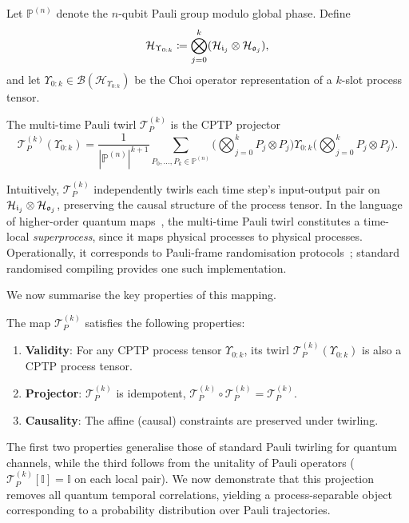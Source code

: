 Let \(\mathbb{P}^{(n)}\) denote the \(n\)-qubit Pauli group modulo global phase. Define 
\begin{equation}
    \mathcal{H}_{\Upsilon_{0:k}} \coloneq \bigotimes_{j=0}^k(\mathcal{H}_{\mathfrak{i}_j} \otimes \mathcal{H}_{\mathfrak{o}_j}),
\end{equation}
and let \(\Upsilon_{0:k} \in \mathcal{B}(\mathcal{H}_{\Upsilon_{0:k}})\) be the Choi operator representation of a \(k\)-slot process tensor.
\begin{definition}\label{def:multi-time-twirl}
    The multi-time Pauli twirl \(\mathcal{T}_P^{(k)}\) is the CPTP projector
    \begin{equation}\label{eq:twirl-upsilon}
        \mathcal{T}_P^{(k)}(\Upsilon_{0:k}) = 
        \frac{1}{|\mathbb{P}^{(n)}|^{k+1}}
        \sum_{P_0,\dots,P_k\in\mathbb{P}^{(n)}}
        \Bigg(\bigotimes_{j=0}^k P_j\otimes P_j\Bigg)
        \Upsilon_{0:k}
        \Bigg(\bigotimes_{j=0}^k P_j\otimes P_j\Bigg).
    \end{equation}
\end{definition}
Intuitively, \(\mathcal{T}_P^{(k)}\) independently twirls each time step's input-output pair on \(\mathcal{H}_{\mathfrak{i}_j} \otimes \mathcal{H}_{\mathfrak{o}_j}\), preserving the causal structure of the process tensor. In the language of higher-order quantum maps~\cite{tarantoHigherOrderQuantumOperations2025}, the multi-time Pauli twirl constitutes a time-local \emph{superprocess}, since it maps physical processes to physical processes. Operationally, it corresponds to Pauli-frame randomisation protocols~\cite{figueroa-romeroOperationalMarkovianizationRandomized2024}; standard randomised compiling provides one such implementation.

We now summarise the key properties of this mapping.
\begin{proposition}[Properties]
    The map \(\mathcal{T}_P^{(k)}\) satisfies the following properties:
    \begin{enumerate}
        \item \textbf{Validity}: For any CPTP process tensor \(\Upsilon_{0:k}\), its twirl \(\mathcal{T}_P^{(k)}(\Upsilon_{0:k})\) is also a CPTP process tensor.
        \item \textbf{Projector}: \(\mathcal{T}_P^{(k)}\) is idempotent, \(\mathcal{T}_P^{(k)} \circ \mathcal{T}_P^{(k)} = \mathcal{T}_P^{(k)}\).
        \item \textbf{Causality}: The affine (causal) constraints are preserved under twirling.
    \end{enumerate}
\end{proposition}
The first two properties generalise those of standard Pauli twirling for quantum channels, while the third follows from the unitality of Pauli operators (\(\mathcal{T}_P^{(k)}[\mathbb{I}] = \mathbb{I}\) on each local pair). We now demonstrate that this projection removes all quantum temporal correlations, yielding a process-separable object corresponding to a probability distribution over Pauli trajectories.

